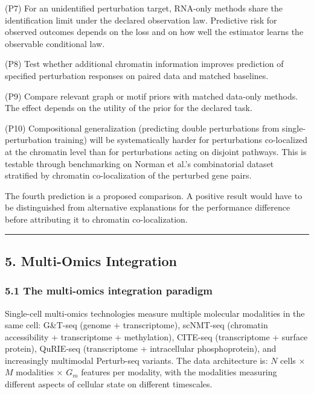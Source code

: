 \documentclass[
]{article}
\begin{document}
(P7) For an unidentified perturbation target, RNA-only methods share the
identification limit under the declared observation law. Predictive risk
for observed outcomes depends on the loss and on how well the estimator
learns the observable conditional law.

(P8) Test whether additional chromatin information improves prediction
of specified perturbation responses on paired data and matched
baselines.

(P9) Compare relevant graph or motif priors with matched data-only
methods. The effect depends on the utility of the prior for the declared
task.

(P10) Compositional generalization (predicting double perturbations from
single-perturbation training) will be systematically harder for
perturbations co-localized at the chromatin level than for perturbations
acting on disjoint pathways. This is testable through benchmarking on
Norman et al.'s combinatorial dataset stratified by chromatin
co-localization of the perturbed gene pairs.

The fourth prediction is a proposed comparison. A positive result would
have to be distinguished from alternative explanations for the
performance difference before attributing it to chromatin
co-localization.

\begin{center}\rule{0.5\linewidth}{0.5pt}\end{center}

\hypertarget{multi-omics-integration}{%
\subsection{5. Multi-Omics Integration}\label{multi-omics-integration}}

\hypertarget{the-multi-omics-integration-paradigm}{%
\subsubsection{5.1 The multi-omics integration
paradigm}\label{the-multi-omics-integration-paradigm}}

Single-cell multi-omics technologies measure multiple molecular
modalities in the same cell: G\&T-seq (genome + transcriptome),
scNMT-seq (chromatin accessibility + transcriptome + methylation),
CITE-seq (transcriptome + surface protein), QuRIE-seq (transcriptome +
intracellular phosphoprotein), and increasingly multimodal Perturb-seq
variants. The data architecture is: \(N\) cells × \(M\) modalities ×
\(G_m\) features per modality, with the modalities measuring different
aspects of cellular state on different timescales.
\end{document}
